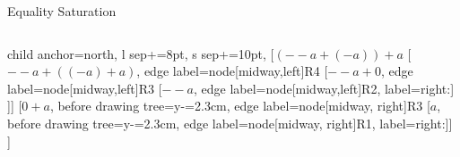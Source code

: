 \documentclass[14pt, aspectratio=169]{beamer}
\begin{document}
\begin{frame}{Equality Saturation}
\begin{columns}
{\begin{minipage}[c][.5\textheight][c]{1\linewidth}
{\begin{forest}
{								child anchor=north,     %
								l sep+=8pt,            %
								s sep+=10pt,             %
							}
							[$(--a + (-a)) + a$
							[$--a + ((-a) + a)$, edge label={node[midway,left]{R4}}
							[$--a + 0$, edge label={node[midway,left]{R3}}
							[$--a$, edge label={node[midway,left]{R2}}, label=right:{\textcolor{red}{}}]
							]]
							[$0 + a$, before drawing tree={y-=2.3cm}, edge label={node[midway, right]{R3}}
							[$a$, before drawing tree={y-=2.3cm}, edge label={node[midway, right]{R1}}, label=right:{\textcolor{green}{\checkmark}}]]
							]
					\end{forest}}
			\end{minipage}}
	\end{columns}
	\end{frame}
	
\end{document}
